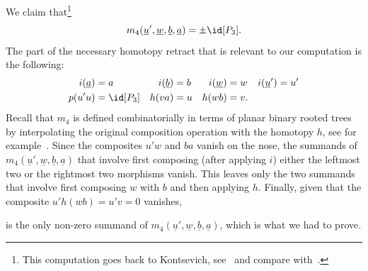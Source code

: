 \documentclass[a4paper]{amsart}
\begin{document}
We claim that\footnote{This computation goes back to Kontsevich,
  see~\cite[Rmk.~3.11]{Sei08} and compare with~\cite[Eq.~3.18]{HKK17}.}
\[
  m_4(\underline{u}',\underline{w},\underline{b},\underline{a})=\pm\id[P_3].
\]
The part of the necessary homotopy retract that is relevant to our computation is
the following:
\begin{align*}
  i(\underline{a})&=a & i(\underline{b})&=b & i(\underline{w})&=w & i(\underline{u}')&=u'\\
  p(u'u)&=\id[P_3] & h(va)&=u & h(wb)&=v.
\end{align*}
Recall that $m_4$ is defined combinatorially in terms of planar binary rooted
trees by interpolating the original composition operation with the homotopy $h$,
see for example~\cite[p.~233]{Val14}. Since the composites $u'w$ and $ba$ vanish
on the nose, the summands of
$m_4(\underline{u}',\underline{w},\underline{b},\underline{a})$ that involve
first composing (after applying $i$) either the leftmost two or the rightmost
two morphisms vanish. This leaves only the two summands that involve first
composing $w$ with $b$ and then applying $h$. Finally, given that the composite
$u'h(wb)=u'v=0$ vanishes,
\begin{center}
\end{center}
is the only non-zero summand of
$m_4(\underline{u}',\underline{w},\underline{b},\underline{a})$, which is what
we had to prove.
\end{document}
